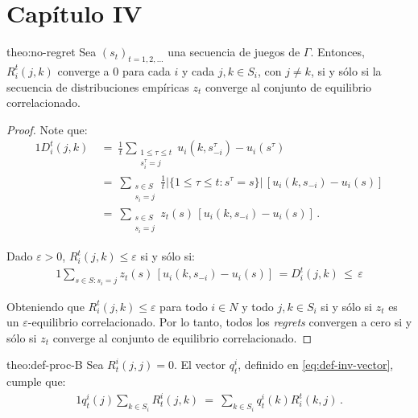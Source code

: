 \section*{Capítulo IV}

\begin{reptheorem}{theo:no-regret}
Sea $(s_t)_{t = 1, 2, ...}$ una secuencia de juegos de $\Gamma$.
Entonces, $R_i^t(j, k)$ converge a $0$ para cada $i$ y cada $j, k \in S_i$, con $j \neq k$, si y sólo si la secuencia de distribuciones empíricas $z_t$ converge al conjunto de equilibrio correlacionado.
\end{reptheorem}

\begin{proof}
Note que:
\begin{alignat}{1}
  D_i^t(j, k)\ 
    &=\ \frac{1}{t} \sum_{\substack{1\leq \tau \leq t \\ s_i^{\tau}=j}} u_i(k, s_{-i}^{\tau}) - u_i(s^{\tau}) \\
    &=\ \sum_{ \substack{s \in S \\ s_i = j}} \frac{1}{t} |\{1\leq\tau \leq t : s^{\tau} = s\}|\,[u_i(k, s_{-i}) - u_i(s)] \\
    &=\ \sum_{ \substack{s \in S \\ s_i = j}} z_t(s)\,[u_i(k, s_{-i}) - u_i(s)] \,.
\end{alignat}

Dado $\varepsilon > 0$, $R_i^t(j, k) \leq \varepsilon$ si y sólo si:
\begin{alignat}{1}
    \sum_{s \in S : s_i = j} z_t(s)\,[u_i(k, s_{-i}) - u_i(s)] \, = D_i^t(j, k) \, \leq \, \varepsilon
\end{alignat}

Obteniendo que $R_i^t(j, k) \leq \varepsilon$ para todo $i \in N$ y todo $j, k \in S_i$ si y sólo si $z_t$ es un $\varepsilon$-equilibrio correlacionado. Por lo tanto, todos los \textit{regrets} convergen a cero si y sólo si $z_t$ converge al conjunto de equilibrio correlacionado.
\end{proof}

\begin{reptheorem}{theo:def-proc-B}
Sea $R_t^i(j, j) = 0$. El vector $q_t^i$, definido en \ref{eq:def-inv-vector}, cumple que:
\begin{alignat}{1}
q^i_t(j)\sum_{k \in S_i} R^i_t(j,k)\ =\ \sum_{k \in S_i} q_t^i(k)R_i^t(k,j) \,.
\end{alignat}
\end{reptheorem}

